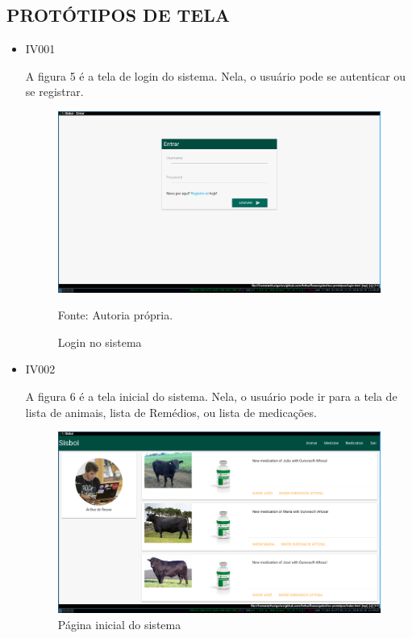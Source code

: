 \subsection{PROTÓTIPOS DE TELA}

\begin{itemize}
\item IV001

A figura 5 é a tela de login do sistema. Nela, o usuário pode se autenticar ou se registrar.
\begin{figure}[H]
	\begin{center}
		\caption{Login no sistema}
		\includegraphics[width=\textwidth]{../img/prototipos/login.png}

		Fonte: Autoria própria.
	\end{center}
\end{figure}

\item IV002

A figura 6 é a tela inicial do sistema. Nela, o usuário pode ir para a tela de lista de animais, lista de Remédios, ou lista de medicações.
\begin{figure}[H]
	\begin{center}
		\caption{Página inicial do sistema}
		\includegraphics[width=\textwidth]{../img/prototipos/index.png}


\end{center}
\end{figure}
\end{itemize}
